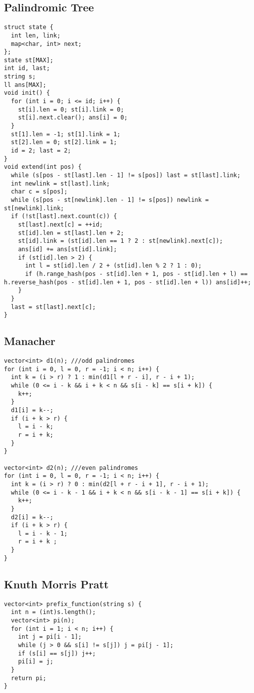 \documentclass[10pt,a4paper,onesided]{article}
\begin{document}
\begin{multicols*}{3}
\subsection{Palindromic Tree}
\begin{lstlisting}
struct state {
  int len, link;
  map<char, int> next;
};
state st[MAX];
int id, last;
string s;
ll ans[MAX];
void init() {
  for (int i = 0; i <= id; i++) {
    st[i].len = 0; st[i].link = 0;
    st[i].next.clear(); ans[i] = 0;
  }
  st[1].len = -1; st[1].link = 1;
  st[2].len = 0; st[2].link = 1;
  id = 2; last = 2;
}
void extend(int pos) {
  while (s[pos - st[last].len - 1] != s[pos]) last = st[last].link;
  int newlink = st[last].link;
  char c = s[pos];
  while (s[pos - st[newlink].len - 1] != s[pos]) newlink = st[newlink].link;
  if (!st[last].next.count(c)) {
    st[last].next[c] = ++id;
    st[id].len = st[last].len + 2;
    st[id].link = (st[id].len == 1 ? 2 : st[newlink].next[c]);
    ans[id] += ans[st[id].link];
    if (st[id].len > 2) {
      int l = st[id].len / 2 + (st[id].len % 2 ? 1 : 0);
      if (h.range_hash(pos - st[id].len + 1, pos - st[id].len + l) == h.reverse_hash(pos - st[id].len + 1, pos - st[id].len + l)) ans[id]++;
    }
  }
  last = st[last].next[c];
}
\end{lstlisting}
\subsection{Manacher}
\begin{lstlisting}
vector<int> d1(n); ///odd palindromes
for (int i = 0, l = 0, r = -1; i < n; i++) {
  int k = (i > r) ? 1 : min(d1[l + r - i], r - i + 1);
  while (0 <= i - k && i + k < n && s[i - k] == s[i + k]) {
    k++;
  }
  d1[i] = k--;
  if (i + k > r) {
    l = i - k;
    r = i + k;
  }
}

vector<int> d2(n); ///even palindromes
for (int i = 0, l = 0, r = -1; i < n; i++) {
  int k = (i > r) ? 0 : min(d2[l + r - i + 1], r - i + 1);
  while (0 <= i - k - 1 && i + k < n && s[i - k - 1] == s[i + k]) {
    k++;
  }
  d2[i] = k--;
  if (i + k > r) {
    l = i - k - 1;
    r = i + k ;
  }
}\end{lstlisting}
\subsection{Knuth Morris Pratt}
\begin{lstlisting}
vector<int> prefix_function(string s) {
  int n = (int)s.length();
  vector<int> pi(n);
  for (int i = 1; i < n; i++) {
    int j = pi[i - 1];
    while (j > 0 && s[i] != s[j]) j = pi[j - 1];
    if (s[i] == s[j]) j++;
    pi[i] = j;
  }
  return pi;
}
\end{lstlisting}

\end{multicols*}
\end{document}

